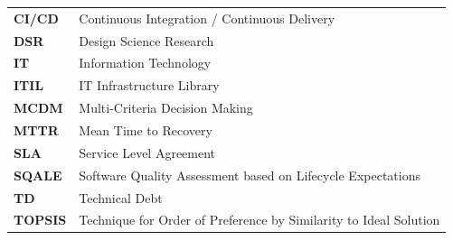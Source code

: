 \begin{tabular}{ll}
\textbf{CI/CD} & Continuous Integration / Continuous Delivery \\
\textbf{DSR}   & Design Science Research \\
\textbf{IT}    & Information Technology \\
\textbf{ITIL}  & IT Infrastructure Library \\
\textbf{MCDM}  & Multi-Criteria Decision Making \\
\textbf{MTTR}  & Mean Time to Recovery \\
\textbf{SLA}   & Service Level Agreement \\
\textbf{SQALE} & Software Quality Assessment based on Lifecycle Expectations \\
\textbf{TD}    & Technical Debt \\
\textbf{TOPSIS}& Technique for Order of Preference by Similarity to Ideal Solution \\
\end{tabular}
